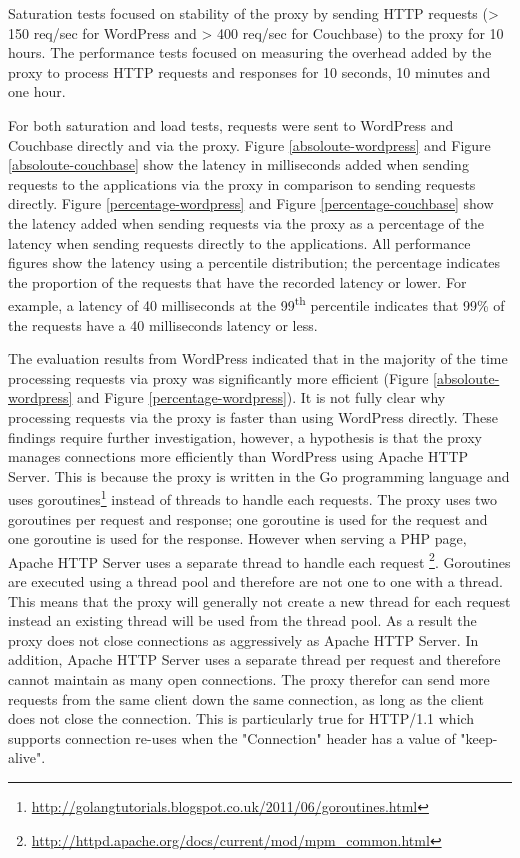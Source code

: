 \documentclass[a4paper,11pt,twoside]{report}
\begin{document}
Saturation tests focused on stability of the proxy by sending HTTP requests (> 150 req/sec for WordPress and > 400 req/sec for Couchbase) to the proxy for 10 hours. The performance tests focused on measuring the overhead added by the proxy to process HTTP requests and responses for 10 seconds, 10 minutes and one hour. 

For both saturation and load tests, requests were sent to WordPress and Couchbase directly and via the proxy. Figure \ref{absoloute-wordpress} and Figure \ref{absoloute-couchbase} show the latency in milliseconds added when sending requests to the applications via the proxy in comparison to sending requests directly.  Figure \ref{percentage-wordpress} and Figure \ref{percentage-couchbase} show the latency added when sending requests via the proxy as a percentage of the latency when sending requests directly to the applications. All performance figures show the latency using a percentile distribution; the percentage indicates the proportion of the requests that have the recorded latency or lower. For example, a latency of 40 milliseconds at the 99\textsuperscript{th} percentile indicates that 99\% of the requests have a 40 milliseconds latency or less.   

The evaluation results from WordPress indicated that in the majority of the time processing requests via proxy was significantly more efficient (Figure \ref{absoloute-wordpress} and Figure \ref{percentage-wordpress}). It is not fully clear why processing requests via the proxy is faster than using WordPress directly. These findings require further investigation, however, a hypothesis is that the proxy manages connections more efficiently than WordPress using Apache HTTP Server. This is because the proxy is written in the Go programming language and uses goroutines\footnote{\label{golangtutorials}\url{http://golangtutorials.blogspot.co.uk/2011/06/goroutines.html}}  instead of threads to handle each requests.  The proxy uses two goroutines per request and response; one goroutine is used for the request and one goroutine is used for the response. However when serving a PHP page, Apache HTTP Server uses a separate thread to handle each request \footnote{\label{apache_thread_per_req}\url{http://httpd.apache.org/docs/current/mod/mpm_common.html}}.  Goroutines are executed using a thread pool and therefore are not one to one with a thread. This means that the proxy will generally not create a new thread for each request instead an existing thread will be used from the thread pool. As a result the proxy does not close connections as aggressively as Apache HTTP Server.  In addition, Apache HTTP Server uses a separate thread per request and therefore cannot maintain as many open connections.  The proxy therefor can send more requests from the same client down the same connection, as long as the client does not close the connection. This is particularly true for HTTP/1.1 which supports connection re-uses when the "Connection" header has a value of "keep-alive".    
\end{document}
